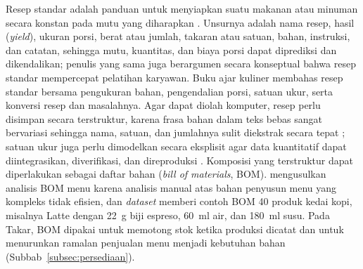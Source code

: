 Resep standar adalah panduan untuk menyiapkan suatu makanan atau minuman secara konstan pada mutu yang diharapkan \citep*{naumov2023employment}. Unsurnya adalah nama resep, hasil (\textit{yield}), ukuran porsi, berat atau jumlah, takaran atau satuan, bahan, instruksi, dan catatan, sehingga mutu, kuantitas, dan biaya porsi dapat diprediksi dan dikendalikan; penulis yang sama juga berargumen secara konseptual bahwa resep standar mempercepat pelatihan karyawan. Buku ajar kuliner \citet*{gisslen2025professional} membahas resep standar bersama pengukuran bahan, pengendalian porsi, satuan ukur, serta konversi resep dan masalahnya. Agar dapat diolah komputer, resep perlu disimpan secara terstruktur, karena frasa bahan dalam teks bebas sangat bervariasi sehingga nama, satuan, dan jumlahnya sulit diekstrak secara tepat \citep*{shi2022attention}; satuan ukur juga perlu dimodelkan secara eksplisit agar data kuantitatif dapat diintegrasikan, diverifikasi, dan direproduksi \citep*{rijgersberg2013ontology}. Komposisi yang terstruktur dapat diperlakukan sebagai daftar bahan (\textit{bill of materials}, BOM). \citet{kamal2021bill} mengusulkan analisis BOM menu karena analisis manual atas bahan penyusun menu yang kompleks tidak efisien, dan \textit{dataset} \citet*{zolfagharnasab2024coffee} memberi contoh BOM 40 produk kedai kopi, misalnya Latte dengan 22~g biji espreso, 60~ml air, dan 180~ml susu. Pada Takar, BOM dipakai untuk memotong stok ketika produksi dicatat dan untuk menurunkan ramalan penjualan menu menjadi kebutuhan bahan (Subbab~\ref{subsec:persediaan}).

